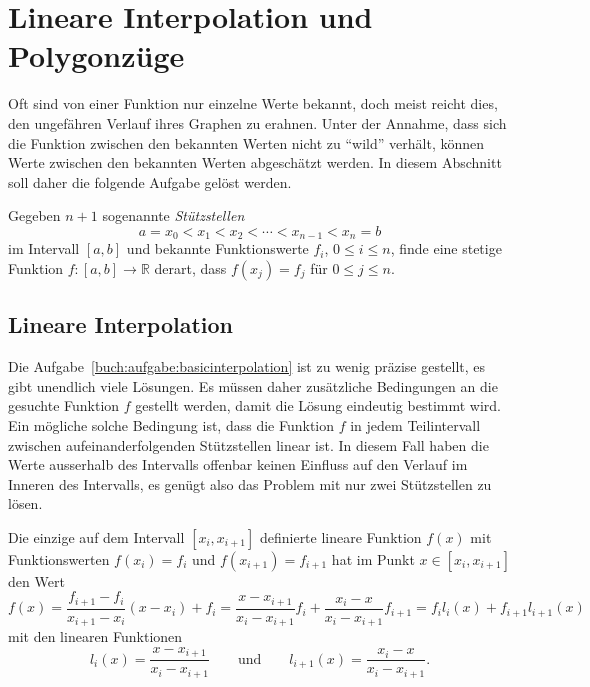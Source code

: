 %
%
%
\section{Lineare Interpolation und Polygonzüge
\label{buch:section:lineareinterpolation}}
Oft sind von einer Funktion nur einzelne Werte bekannt, doch meist reicht
dies, den ungefähren Verlauf ihres Graphen zu erahnen.
Unter der Annahme, dass sich die Funktion zwischen den bekannten Werten
nicht zu ``wild'' verhält, können Werte zwischen den bekannten Werten
abgeschätzt werden.
In diesem Abschnitt soll daher die folgende Aufgabe gelöst werden.

\begin{aufgabe}
\label{buch:aufgabe:basicinterpolation}
Gegeben $n+1$ sogenannte {\em Stützstellen}
\[
a=x_0<x_1<x_2<\cdots<x_{n-1}<x_n=b
\]
im Intervall $[a,b]$ und bekannte Funktionswerte $f_i$, $0\le i\le n$,
finde eine stetige Funktion $f\colon[a,b]\to \mathbb R$ derart, dass
$f(x_j)=f_j$ für $0\le j\le n$.
\end{aufgabe}

\subsection{Lineare Interpolation
\label{buch:subsection:lineareinterpolation}}
Die Aufgabe~\eqref{buch:aufgabe:basicinterpolation} ist zu wenig präzise
gestellt, es gibt unendlich viele Lösungen.
Es müssen daher zusätzliche Bedingungen an die gesuchte Funktion $f$
gestellt werden, damit die Lösung eindeutig bestimmt wird.
Ein mögliche solche Bedingung ist, dass die Funktion $f$ in jedem
Teilintervall zwischen aufeinanderfolgenden Stützstellen linear ist.
In diesem Fall haben die Werte ausserhalb des Intervalls offenbar 
keinen Einfluss auf den Verlauf im Inneren des Intervalls, es genügt
also das Problem mit nur zwei Stützstellen zu lösen.

\begin{satz}
\label{buch:satz:lineareinterpolation}
Die einzige auf dem Intervall $[x_i,x_{i+1}]$ definierte lineare Funktion 
$f(x)$ mit Funktionswerten $f(x_i)=f_i$ und $f(x_{i+1}) = f_{i+1}$
hat im Punkt $x\in[x_i,x_{i+1}]$
den Wert
\begin{equation}
f(x)
=
\frac{f_{i+1}-f_i}{x_{i+1}-x_i} (x-x_i) + f_i
=
\frac{x-x_{i+1}}{x_i-x_{i+1}} f_i
+
\frac{x_{i}-x}{x_i-x_{i+1}} f_{i+1}
=
f_il_i(x) + f_{i+1}l_{i+1}(x)
\label{buch:eqn:lineareinterpolation}
\end{equation}
mit den linearen Funktionen
\begin{equation}
l_i(x) = \frac{x-x_{i+1}}{x_i-x_{i+1}}
\qquad\text{und}\qquad
l_{i+1}(x) = \frac{x_i-x}{x_i-x_{i+1}}.
\label{buch:eqn:linl0l1}
\end{equation}
\end{satz}

